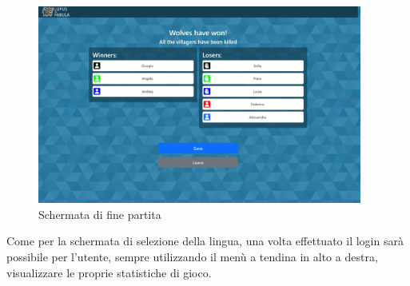 \begin{figure}[H]
\begin{minipage}{0.25\textwidth}
    \end{minipage}\hfill
    \begin{minipage}{0.75\textwidth}
        \centering
        \includegraphics[width=0.95\textwidth]{img/screen/desktop/won_desktop.png}
    \end{minipage}
    \caption{Schermata di fine partita}
    \label{fig:won_ui}
\end{figure}

Come per la schermata di selezione della lingua, una volta effettuato il login sarà possibile per l'utente, sempre utilizzando il menù a tendina in alto a destra, visualizzare le proprie statistiche di gioco.

